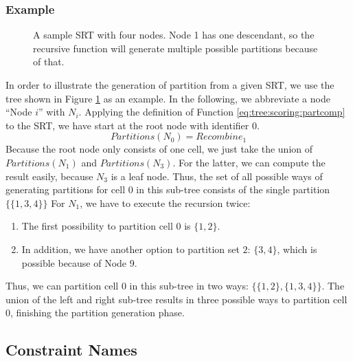 		\clearpage

		\subsubsection{Example}

			\begin{figure}[ht!]
				\centering
				
				\caption{A sample \ac{SRT} with four nodes. Node 1 has one descendant, so the recursive function will generate multiple possible partitions because of that.}
				\label{fig:tree:scoring:example}
			\end{figure}

			In order to illustrate the generation of partition from a given \ac{SRT}, we use the tree shown in Figure \ref{fig:tree:scoring:example} as an example.
			In the following, we abbreviate a node \enquote{Node $i$} with $N_i$.
			Applying the definition of Function \ref{eq:tree:scoring:partcomp} to the \ac{SRT}, we have start at the root node with identifier 0.
			\begin{equation*}
				Partitions(N_0) = {Recombine}_1
			\end{equation*}
			Because the root node only consists of one cell, we just take the union of $Partitions(N_1)$ and $Partitions(N_3)$.
			For the latter, we can compute the result easily, because $N_3$ is a leaf node. Thus, the set of all possible ways of generating partitions for cell 0 in this sub-tree consists of the single partition $\{ \{ 1, 3, 4 \} \}$
			For $N_1$, we have to execute the recursion twice:

			\begin{enumerate}
				\item The first possibility to partition cell 0 is $\{ 1, 2 \}$.
				\item In addition, we have another option to partition set $2$: $\{ 3, 4 \}$, which is possible because of Node 9.
			\end{enumerate}

			Thus, we can partition cell 0 in this sub-tree in two ways: $\{ \{ 1, 2 \}, \{ 1, 3, 4 \} \}$.
			The union of the left and right sub-tree results in three possible ways to partition cell 0, finishing the partition generation phase.

		\clearpage

		\subsection{Constraint Names}
		\label{chap:tree:scoring:names}

